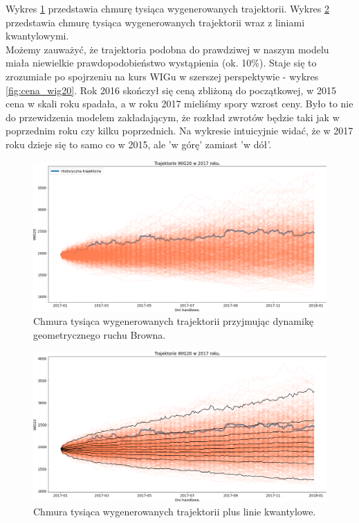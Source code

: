 \documentclass[12pt]{article}
\begin{document}
Wykres \ref{fig:pred_wig20} przedstawia chmurę tysiąca wygenerowanych trajektorii. 
Wykres \ref{fig:pred_wig20_q} przedstawia chmurę tysiąca wygenerowanych trajektorii wraz z liniami kwantylowymi. 
\\ 
Możemy zauważyć, że trajektoria podobna do prawdziwej w naszym modelu miała niewielkie prawdopodobieństwo wystąpienia (ok. 10\%). Staje się to zrozumiałe po spojrzeniu na kurs WIGu w szerszej perspektywie - wykres \ref{fig:cena_wig20}. Rok 2016 skończył się ceną zbliżoną do początkowej, w 2015 cena w skali roku spadała, a w roku 2017 mieliśmy spory wzrost ceny. Było to nie do przewidzenia modelem zakładającym, że rozkład zwrotów będzie taki jak w poprzednim roku czy kilku poprzednich. Na wykresie intuicyjnie widać, że w 2017 roku dzieje się to samo co w 2015, ale 'w górę' zamiast 'w dół'.

\begin{figure}[htp]
    \centering
    \includegraphics[width=\textwidth,height=\textheight,keepaspectratio]{trajektorie_wig20_predykcje_2017.png}
    \caption{Chmura tysiąca wygenerowanych trajektorii przyjmując dynamikę geometrycznego ruchu Browna.}
    \label{fig:pred_wig20}
\end{figure}

\begin{figure}[htp]
    \centering
    \includegraphics[width=\textwidth,height=\textheight,keepaspectratio]{trajektorie_wig20_predykcje_2017_kwantyle.png}
    \caption{Chmura tysiąca wygenerowanych trajektorii plus linie kwantylowe.}
    \label{fig:pred_wig20_q}
\end{figure}
\newpage
\end{document}
